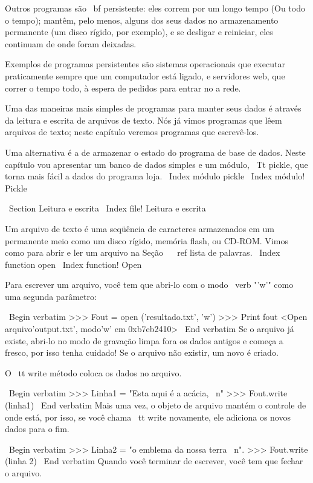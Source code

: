 \documentclass[10pt]{book}
\begin{document}
{{{{{{{{{{Outros programas são {\ bf persistente}: eles correm por um longo tempo
(Ou todo o tempo); mantêm, pelo menos, alguns dos seus dados
no armazenamento permanente (um disco rígido, por exemplo), e
se desligar e reiniciar, eles continuam de onde foram deixadas.

Exemplos de programas persistentes são sistemas operacionais que
executar praticamente sempre que um computador está ligado, e servidores web,
que correr o tempo todo, à espera de pedidos para entrar no
a rede.

Uma das maneiras mais simples de programas para manter seus dados
é através da leitura e escrita de arquivos de texto. Nós já vimos
programas que lêem arquivos de texto; neste capítulo veremos programas
que escrevê-los.

Uma alternativa é a de armazenar o estado do programa de base de dados.
Neste capítulo vou apresentar um banco de dados simples e um módulo,
{\ Tt pickle}, que torna mais fácil a dados do programa loja.
\ Index {módulo pickle}
\ Index {módulo! Pickle}


\ Section {Leitura e escrita}
\ Index {file! Leitura e escrita}

Um arquivo de texto é uma seqüência de caracteres armazenados em um permanente
meio como um disco rígido, memória flash, ou CD-ROM. Vimos como
para abrir e ler um arquivo na Seção ~ \ ref {lista de palavras}.
\ Index {function open}
\ Index {function! Open}

Para escrever um arquivo, você tem que abri-lo com o modo \ verb "'w'" como uma segunda
parâmetro:

\ Begin {verbatim}
>>> Fout = open ('resultado.txt', 'w')
>>> Print fout
<Open arquivo'output.txt', modo'w' em 0xb7eb2410>
\ End {verbatim}
%
Se o arquivo já existe, abri-lo no modo de gravação limpa fora
os dados antigos e começa a fresco, por isso tenha cuidado!
Se o arquivo não existir, um novo é criado.

O {\ tt write} método coloca os dados no arquivo.

\ Begin {verbatim}
>>> Linha1 = "Esta aqui é a acácia, \ n"
>>> Fout.write (linha1)
\ End {verbatim}
%
Mais uma vez, o objeto de arquivo mantém o controle de onde está, por isso, se
você chama {\ tt write} novamente, ele adiciona os novos dados para o fim.

\ Begin {verbatim}
>>> Linha2 = "o emblema da nossa terra \ n".
>>> Fout.write (linha 2)
\ End {verbatim}
%
Quando você terminar de escrever, você tem que fechar o arquivo.

}}}}}}}}}}
\end{document}
